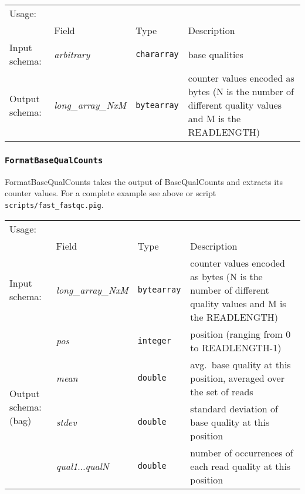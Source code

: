 \begin{tabular}{lp{}p{}p{}}
Usage: & \multicolumn{3}{l}{}
\hspace*{-0.55cm}\begin{minipage}{0.85\textwidth}
  \begin{lstlisting}
  reads = LOAD 'input.fq' USING FastqLoader();
  qualities = FOREACH reads GENERATE quality;
  base_qual_counts = FOREACH (GROUP qualities ALL) GENERATE BaseQualCounts($1);
  formatted_base_qual_counts = FOREACH base_qual_counts GENERATE FormatBaseQualCounts($0);
  \end{lstlisting}
  \end{minipage}\hfill\kern-\arrayrulewidth
 \\[0.25cm]
& Field & Type & Description\\[0.1cm]
Input schema: & \emph{arbitrary} & \texttt{chararray} & base qualities\\
Output schema: & \emph{long\_array\_NxM} & \texttt{bytearray} & counter values encoded as bytes (N is the number of different
quality values and M is the READLENGTH)
\end{tabular}

\subsubsection{\texttt{FormatBaseQualCounts}}

FormatBaseQualCounts takes the output of BaseQualCounts and extracts
its counter values. For a complete example see above or script
\texttt{scripts/fast\_fastqc.pig}.

\begin{tabular}{lp{}p{}p{}}
Usage: & \multicolumn{3}{l}{}
\hspace*{-0.55cm}\begin{minipage}{0.85\textwidth}
  \begin{lstlisting}
  base_qual_counts = FOREACH (GROUP qualities ALL) GENERATE BaseQualCounts($1);
  formatted_base_qual_counts = FOREACH base_qual_counts GENERATE FormatBaseQualCounts($0);
  \end{lstlisting}
  \end{minipage}\hfill\kern-\arrayrulewidth
 \\[0.25cm]
& Field & Type & Description\\[0.1cm]
Input schema: & \emph{long\_array\_NxM} & \texttt{bytearray} & counter values encoded as bytes (N is the number of different
quality values and M is the READLENGTH)\\\hline
\multirow{4}{*}{\parbox{2.2cm}{Output schema: (bag)}} & \emph{pos} & \texttt{integer} & position (ranging from 0 to READLENGTH-1)\\
& \emph{mean} & \texttt{double} & avg.~base quality at this position, averaged over the set of reads\\
& \emph{stdev} & \texttt{double} & standard deviation of base quality at this position\\
& \emph{qual1}$\ldots$\emph{qualN} & \texttt{double} & number of occurrences of each read quality at this position
\end{tabular}

